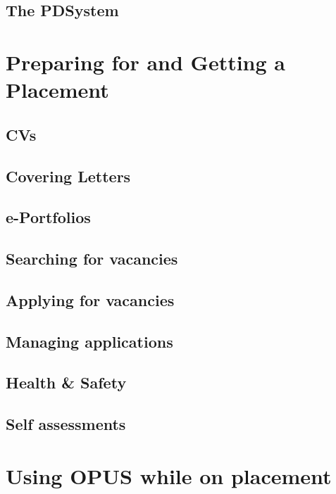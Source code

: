 \documentclass[12 pt]{book}
\begin{document}
\section{The PDSystem}

%
%
%

\chapter{Preparing for and Getting a Placement}

\section{CVs}

\section{Covering Letters}

\section{e-Portfolios}

\section{Searching for vacancies}

\section{Applying for vacancies}

\section{Managing applications}

\section{Health \& Safety}

\section{Self assessments}

%
%
%


\chapter{Using OPUS while on placement}
\end{document}
